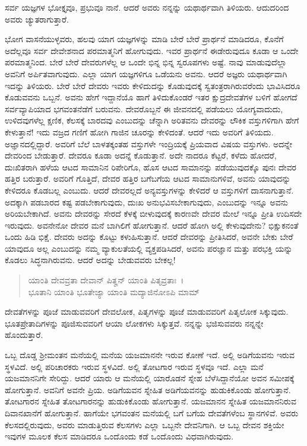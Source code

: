 {\small ಸರ್ವ ಯಜ್ಞಗಳ ಭೋಕ್ತೃವೂ, ಪ್ರಭುವೂ ನಾನೆ. ಆದರೆ ಅವರು ನನ್ನನ್ನು ಯಥಾರ್ಥವಾಗಿ ತಿಳಿಯರು. ಆದುದರಿಂದ ಅವರು ಚ್ಯುತರಾಗುತ್ತಾರೆ.}

ಭೋಗ ವಾಸನೆಯುಳ್ಳವರು, ಹಲವು ಯಾಗ ಯಜ್ಞಗಳನ್ನು ಮಾಡಿ ಬೇರೆ ಬೇರೆ ಪ್ರಾರ್ಥನೆ ಮಾಡಿದರೂ, ಕೊನೆಗೆ ಅದೆಲ್ಲವೂ ಸರ್ವ ದೇವೇಶನಾದ ಪರಮಾತ್ಮನಿಗೆ ಹೋಗುವುದು. ಇವರ ಪ್ರಾರ್ಥನೆ ಈಡೇರುವುದೂ ಕೂಡಾ ಆ ಒಂದೇ ಪರಮಾತ್ಮನಿಂದ. ಬೇರೆ ಬೇರೆ ದೇವರುಗಳೆಲ್ಲ ಆ ಒಂದೇ ಭಿನ್ನ ಭಿನ್ನ ಸ್ವರೂಪಗಳು ಅಷ್ಟೆ. ನಾವು ಮಾಡುವುದೆಲ್ಲಾ ಅವನಿಗೆ ಅರ್ಪಿತವಾಗುವುದು. ಎಲ್ಲಾ ಯಾಗ ಯಜ್ಞಗಳಿಗೂ ಒಡೆಯನು ಅವನು. ಆದರೆ ಅಜ್ಞರು ಯಥಾರ್ಥವಾಗಿ ಇದನ್ನು ತಿಳಿಯರು. ಬೇರೆ ಬೇರೆ ದೇವರು ಇವರು ಕೇಳಿದುದನ್ನು ಕೊಡುವುದಕ್ಕೆ ಸ್ವತಂತ್ರರಾಗಿರುವರೆಂದು ಭಾವಿಸಿದರೂ ಕೊಡುವವನು ಒಬ್ಬನೆ. ಅವನು ಹೇಗೆ ಇದ್ದಾನೆಯೊ ಹಾಗೆ ತಿಳಿದುಕೊಂಡರೆ ಇತರ ಕ್ಷುದ್ರದೇವತೆಗಳ ಬಳಿಗೆ ಹೋಗದೆ ಸರ್ವವ್ಯಾಪಿಯಾದ ಭಗವಂತನೆಡೆಗೆ ಬರುವನು. ದೇವರೊಬ್ಬನೆ ಈ ಜೀವನದಲ್ಲಿ ಪಡೆಯಲು ಯೋಗ್ಯವಾದುದು, ಉಳಿದವುಗಳೆಲ್ಲ ಕ್ಷಣಿಕ, ಕೆಲಸಕ್ಕೆ ಬಾರದವು ಎಂಬುದನ್ನು ಚೆನ್ನಾಗಿ ಅರಿತವನು ದೇವರನ್ನು ಲೌಕಿಕ ವಸ್ತುಗಳಿಗಾಗಿ ಹೇಗೆ ಕೇಳುತ್ತಾನೆ! ಇದು ವಜ್ರದ ಗಣಿಗೆ ಹೋಗಿ ಗಾಜಿನ ಚೂರನ್ನು ಕೇಳಿದಂತೆ. ಆದರೆ ಇದು ಅವರಿಗೆ ತಿಳಿಯದು. ಅಜ್ಞಾನದಲ್ಲಿದ್ದಾರೆ. ಅವರಿಗೆ ಬೆಲೆ ಬಾಳತಕ್ಕಂತಹ ವಸ್ತುಗಳೇ ಇಂದ್ರಿಯಕ್ಕೆ ಪ್ರಿಯವಾದ ವಿಷಯ ವಸ್ತುಗಳು. ಅದನ್ನೇ ದೇವರಿಂದ ಬೇಡುತ್ತಾರೆ. ದೇವರೂ ಕೂಡಾ ಅದನ್ನೆ ಕೊಡುತ್ತಾನೆ. ಅದೇ ನಾದರೂ ಕೆಟ್ಟರೆ, ಕಳೆದು ಹೋದರೆ, ದುಃಖಿತರಾಗಿ ಹಳೆಯ ಆಟದ ಸಾಮಾನಿನ ರಿಪೇರಿಗೊ, ಹೊಸ ಆಟದ ಸಾಮಾನನ್ನು ಪಡೆಯುವುದಕ್ಕೊ ಪುನಃ ದೇವರ ಹತ್ತಿರ ಬರುತ್ತಾರೆ. ಅವರಿಗೆ ಗೊತ್ತಿದೆ, ದೇವರ ಹತ್ತಿರ ಬಗೆಬಗೆಯ ಆಟದ ಸಾಮಾನುಗಳಿವೆ, ಅವನು ಯಾವುದನ್ನು ಕೇಳಿದರೂ ಕೊಡಬಲ್ಲ ಎಂಬುದು. ಆದರೆ ದೇವರಲ್ಲದೆ ಅನ್ಯವಸ್ತುಗಳನ್ನು ಕೇಳಿದರೆ ಆ ವಸ್ತುಗಳಿಗೆ ದಾಸನಾಗುತ್ತಾನೆ. ಅದಕ್ಕಾಗಿ ಪಡಬಾರದ ಕಷ್ಟ ಪಡಬೇಕಾಗುವುದು, ದುಃಖ ಅನುಭವಿಸಬೇಕಾಗುವುದು, ಎಂಬುದನ್ನು ಇನ್ನೂ ಅವನು ಅರಿಯಬೇಕಾಗಿದೆ. ಅವನು ದೇವರನ್ನು ಸೇರದೆ ಕೆಳಕ್ಕೆ ಬೀಳುವುದಕ್ಕೆ ಕಾರಣವೇ ದೇವರ ಮೇಲೆ ಇನ್ನೂ ಪ್ರೀತಿ ಉದಿಸದೇ ಇರುವುದು. ಅವನೇನೋ ದೇವರ ಮನೆ ಬಾಗಿಲಿಗೆ ಹೋಗುತ್ತಾನೆ. ಆದರೆ ಹೋಗಿ ಅಲ್ಲಿ ಕೇಳುವುದೇನು? ಭಿಕ್ಷುಕನಂತೆ ಒಂದು ಹಿಡಿ ಭಿಕ್ಷೆ. ದೇವರು ಅದನ್ನು ಕೊಟ್ಟು ಕಳುಹಿಸುತ್ತಾನೆ. ಆದರೆ ದೇವರನ್ನು ಪ್ರೀತಿಸಿದರೆ, ಅವನೇ ಬೇಕು ಬೇರೆ ಯಾವುದೂ ಅಲ್ಲ ಎಂಬುದನ್ನು ನಮ್ಮ ವ್ಯಾಕುಲತೆಯಲ್ಲಿ ವ್ಯಕ್ತಪಡಿಸಿದರೆ, ಅವನು ಪರಜ್ಞಾನ ಮತ್ತು ಪರಭಕ್ತಿ ಯನ್ನು ಕೊಡಲು ಸಿದ್ಧನಾಗಿರುವನು. ಆದರೆ ಅದನ್ನು ಬೇಡುವವರು ಬೇಕಲ್ಲ!

\begin{verse}
ಯಾಂತಿ ದೇವವ್ರತಾ ದೇವಾನ್ ಪಿತೄನ್ ಯಾಂತಿ ಪಿತೃವ್ರತಾಃ~।\\ಭೂತಾನಿ ಯಾಂತಿ ಭೂತೇಜ್ಯಾ ಯಾಂತಿ ಮದ್ಯಾಜಿನೋಽಪಿ ಮಾಮ್ 
\end{verse}

{\small ದೇವತೆಗಳನ್ನು ಪೂಜೆ ಮಾಡುವವರಿಗೆ ದೇವಲೋಕ, ಪಿತೃಗಳನ್ನು ಪೂಜೆ ಮಾಡುವವರಿಗೆ ಪಿತೃಲೋಕ ಸಿಕ್ಕುವುದು. ಭೂತಪ್ರೇತಾದಿಗಳನ್ನು ಪೂಜಿಸುವವರಿಗೆ ಆಯಾ ಲೋಕಗಳು ಸಿಕ್ಕುತ್ತವೆ. ನನ್ನನ್ನು ಭಜಿಸುವವರು ನನ್ನನ್ನೇ ಹೊಂದುತ್ತಾರೆ.}

ಒಬ್ಬ ದೊಡ್ಡ ಶ‍್ರೀಮಂತನ ಮನೆಯಲ್ಲಿ ಮನೆಯ ಯಜಮಾನನೇ ಇರುವ ಕೋಣೆ ಇದೆ. ಅಲ್ಲಿ ಅಡಿಗೆಯವನು ಇರುವ ಸ್ಥಳವಿದೆ. ಅಲ್ಲಿ ಪರಿಚಾರಕರು ಇರುವ ಸ್ಥಳವಿದೆ. ಅಲ್ಲಿ ತೋಟಗಾರ ಇರುವ ಸ್ಥಳವೂ ಇದೆ. ಎಲ್ಲಾ ಮನೆ ಯಜಮಾನನಿಗೇ ಸೇರಿದ್ದು. ಆದರೆ ಯಾರು ಆ ಮನೆಯಲ್ಲಿ ಯಾರೊಡನೆ ಸ್ನೇಹ ಬೆಳೆಸಿದ್ದಾನೆಯೋ ಅವನ ಸಮೀಪಕ್ಕೆ ಹೋಗುತ್ತಾನೆ. ಅವನಿಗೆ ಅವನೇ ಪ್ರಿಯ. ಅಡಿಗೆಯವನ ಸ್ನೇಹಿತ ಅಡಿಗೆಯವನನ್ನು ಹುಡುಕಿಕೊಂಡು ಹೋಗುತ್ತಾನೆ. ತೋಟಗಾರನ ಸ್ನೇಹಿತ ತೋಟಗಾರನನ್ನು ಹುಡುಕಿಕೊಂಡು ಹೋಗುತ್ತಾನೆ. ಯಜಮಾನನ ಸ್ನೇಹಿತ ಯಜಮಾನನಿರುವ ದಿವಾನಖಾನೆಗೆ ಹೋಗುತ್ತಾನೆ. ಹಾಗೆಯೇ ಭಗವಂತನ ಮನೆಯಲ್ಲಿ ಬಗೆ ಬಗೆಯ ದೇವತೆಗಳೆಂಬ ಸ್ಥಾನಗಳಿವೆ. ಅವರು ಕೆಲಸದಲ್ಲಿರುವುದು, ಅವರು ಮಾಡುತ್ತಿರುವ ಕೆಲಸಗಳು ಎಲ್ಲಾ ಒಬ್ಬನೇ ದೇವನಿಗಾಗಿ. ಆ ಒಬ್ಬ ದೇವನ ಶಕ್ತಿಯೇ ಇವುಗಳ ಮೂಲಕ ಕೆಲಸ ಮಾಡಿದರೂ ಒಂದೊಂದು ಕಡೆ ಒಂದೊಂದು ವಿಧವಾಗಿರುವುದು. 

